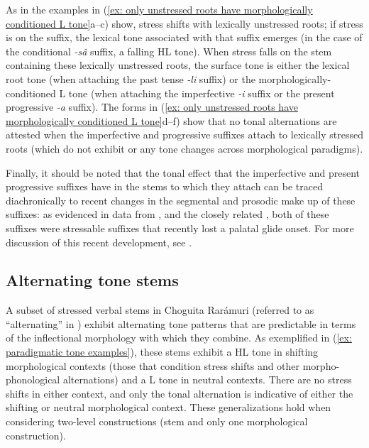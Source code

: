 As in the examples in (\ref{ex: only unstressed roots have morphologically conditioned L tone}a--c) show, stress shifts with lexically unstressed roots; if stress is on the suffix, the lexical tone associated with that suffix emerges (in the case of the conditional \textit{-sâ} suffix, a falling HL tone). When stress falls on the stem containing these lexically unstressed roots, the surface tone is either the lexical root tone (when attaching the past tense \textit{-li} suffix) or the morphologically-conditioned L tone (when attaching the imperfective \textit{-i} suffix or the present progressive \textit{-a} suffix). The forms in (\ref{ex: only unstressed roots have morphologically conditioned L tone}d--f) show that no tonal alternations are attested when the imperfective and progressive suffixes attach to lexically stressed roots (which do not exhibit or any tone changes across morphological paradigms).

Finally, it should be noted that the tonal effect that the imperfective and present progressive suffixes have in the stems to which they attach can be traced diachronically to recent changes in the segmental and prosodic make up of these suffixes: as evidenced in data from  \parencite{brambila1953gramatica}, and the closely related  \parencite{miller1996guarijio}, both of these suffixes were stressable suffixes that recently lost a palatal glide onset. For more discussion of this recent development, see .

\subsection{Alternating tone stems}
\label{subsec: alternating tone stems}

A subset of stressed verbal stems in Choguita Rarámuri (referred to as ``alternating'' in \citealt{caballero2015tone}) exhibit alternating tone patterns that are predictable in terms of the inflectional morphology with which they combine. As exemplified in (\ref{ex: paradigmatic tone examples}), these stems exhibit a HL tone in shifting morphological contexts (those that condition stress shifts and other morpho-phonological alternations) and a L tone in neutral contexts. There are no stress shifts in either context, and only the tonal alternation is indicative of either the shifting or neutral morphological context. These generalizations hold when considering two-level constructions (stem and only one morphological construction).

